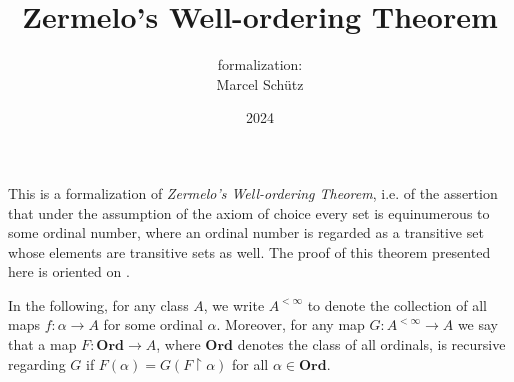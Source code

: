 \documentclass{article}
\title{Zermelo's Well-ordering Theorem}
\author{\Naproche formalization:\\[0.5em]Marcel Schütz}
\date{2024}
\newcommand\Ord{\textbf{Ord}}
\begin{document}
  \maketitle

  \noindent This is a formalization of \textit{Zermelo's Well-ordering Theorem},
  i.e. of the assertion that under the assumption of the axiom of choice every
  set is equinumerous to some ordinal number, where an ordinal number is
  regarded as a transitive set whose elements are transitive sets as well.
  The proof of this theorem presented here is oriented on \cite{Koepke2018}.

  In the following, for any class $A$, we write $A^{< \infty}$ to
  denote the collection of all maps $f : \alpha \to A$ for some ordinal
  $\alpha$.
  Moreover, for any map $G : A^{< \infty} \to A$ we say that a map $F : \Ord \to
  A$, where $\Ord$ denotes the class of all ordinals, is recursive regarding $G$
  if $F(\alpha) = G(F \restriction \alpha)$ for all $\alpha \in \Ord$.


  \printbibliography
\end{document}
